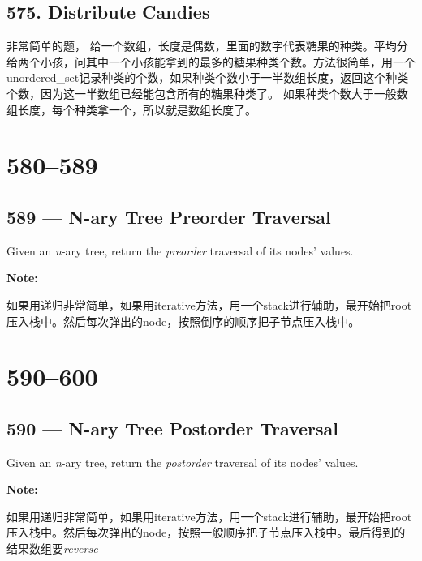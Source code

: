 \documentclass[a4paper,12pt]{article}
\begin{document}
	\subsection{575. Distribute Candies}
	\begin{CJK*}{UTF8}{gbsn}
		非常简单的题， 给一个数组，长度是偶数，里面的数字代表糖果的种类。平均分给两个小孩，问其中一个小孩能拿到的最多的糖果种类个数。方法很简单，用一个unordered\_set记录种类的个数，如果种类个数小于一半数组长度，返回这个种类个数，因为这一半数组已经能包含所有的糖果种类了。 如果种类个数大于一般数组长度，每个种类拿一个，所以就是数组长度了。
		\clearpage\end{CJK*}
	
	\section{580--589}
	
	\subsection{589 --- N-ary Tree Preorder Traversal }
	Given an \textit{n}-ary tree, return the \textit{preorder} traversal of its nodes' values.
	\par
	\vspace{0.5em}
	\noindent
	\textbf{\large{Note:}}
	\par
	\vspace{0.5em}
	\noindent
	\begin{CJK*}{UTF8}{gbsn}
		如果用递归非常简单，如果用iterative方法，用一个stack进行辅助，最开始把root压入栈中。然后每次弹出的node，按照倒序的顺序把子节点压入栈中。
		\clearpage\end{CJK*}
	
	\section{590--600}
	\subsection{590 --- N-ary Tree Postorder Traversal}
	Given an \textit{n}-ary tree, return the \textit{postorder} traversal of its nodes' values.
	\par
	\vspace{0.5em}
	\noindent
	\textbf{\large{Note:}}
	\par
	\vspace{0.5em}
	\noindent
	\begin{CJK*}{UTF8}{gbsn}
		如果用递归非常简单，如果用iterative方法，用一个stack进行辅助，最开始把root压入栈中。然后每次弹出的node，按照一般顺序把子节点压入栈中。最后得到的结果数组要\textit{reverse}
		\clearpage\end{CJK*}
	
\end{document}
